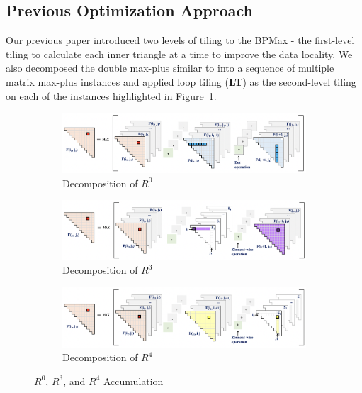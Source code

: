 \subsection{Previous Optimization Approach} Our previous paper \cite{Mondal2021} introduced two levels of tiling to the BPMax - the first-level tiling to calculate each inner triangle at a time to improve the data locality. We also decomposed the double max-plus similar to \cite{Varadarajan2016} into a sequence of multiple matrix max-plus instances and applied loop tiling (\textbf{LT}) as the second-level tiling on each of the instances highlighted in Figure~\ref{fig:double_max_plus_accumulation_sequence_0}.
\begin{figure}[htbp]
\centering
\begin{subfigure}[b]{0.48\textwidth}
\centering
\includegraphics[scale=0.30, trim=4 4 4 4,clip]{content/figures/r0_1.png}
\caption{Decomposition of $R^{0}$}
\label{fig:double_max_plus_accumulation_sequence_0}
\end{subfigure}
\begin{subfigure}[b]{0.48\textwidth}
\vspace{1mm}
\centering
\includegraphics[scale=0.30, trim=4 4 4 4,clip]{content/figures/r3_1.png}
\caption{Decomposition of $R^{3}$}
\label{fig:R_3_optimization}
\end{subfigure}
\begin{subfigure}[b]{0.48\textwidth}
\vspace{1mm}
\centering
\includegraphics[scale=0.30, trim=4 4 4 4,clip]{content/figures/r4_1.png}
\caption{Decomposition of $R^{4}$}
\label{fig:R_4_optimization}
\end{subfigure}
\caption{$R^{0}$, $R^{3}$, and $R^{4}$ Accumulation}
\label{fig:bpm_outer_accumulation_sequence}
\end{figure}
